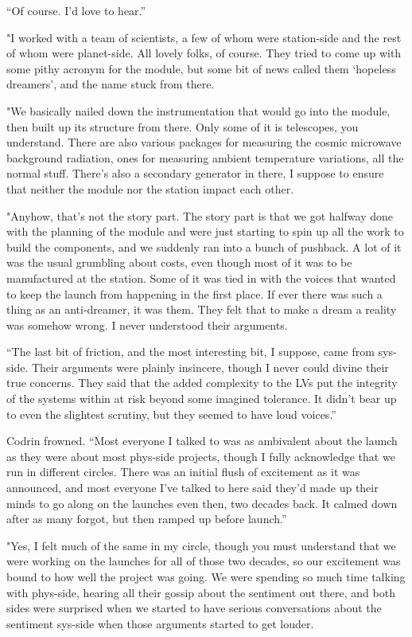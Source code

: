 ``Of course. I'd love to hear.''

"I worked with a team of scientists, a few of whom were station-side and the rest of whom were planet-side. All lovely folks, of course. They tried to come up with some pithy acronym for the module, but some bit of news called them `hopeless dreamers', and the name stuck from there.

"We basically nailed down the instrumentation that would go into the module, then built up its structure from there. Only some of it is telescopes, you understand. There are also various packages for measuring the cosmic microwave background radiation, ones for measuring ambient temperature variations, all the normal stuff. There's also a secondary generator in there, I suppose to ensure that neither the module nor the station impact each other.

"Anyhow, that's not the story part. The story part is that we got halfway done with the planning of the module and were just starting to spin up all the work to build the components, and we suddenly ran into a bunch of pushback. A lot of it was the usual grumbling about costs, even though most of it was to be manufactured at the station. Some of it was tied in with the voices that wanted to keep the launch from happening in the first place. If ever there was such a thing as an anti-dreamer, it was them. They felt that to make a dream a reality was somehow wrong. I never understood their arguments.

``The last bit of friction, and the most interesting bit, I suppose, came from sys-side. Their arguments were plainly insincere, though I never could divine their true concerns. They said that the added complexity to the LVs put the integrity of the systems within at risk beyond some imagined tolerance. It didn't bear up to even the slightest scrutiny, but they seemed to have loud voices.''

Codrin frowned. ``Most everyone I talked to was as ambivalent about the launch as they were about most phys-side projects, though I fully acknowledge that we run in different circles. There was an initial flush of excitement as it was announced, and most everyone I've talked to here said they'd made up their minds to go along on the launches even then, two decades back. It calmed down after as many forgot, but then ramped up before launch.''

"Yes, I felt much of the same in my circle, though you must understand that we were working on the launches for all of those two decades, so our excitement was bound to how well the project was going. We were spending so much time talking with phys-side, hearing all their gossip about the sentiment out there, and both sides were surprised when we started to have serious conversations about the sentiment sys-side when those arguments started to get louder.

